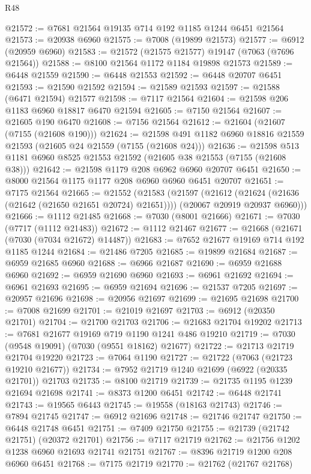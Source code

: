 \begin{lexlean}{R48}
\begin{coremodule}
@21572 := @7681 @21564 @19135 @714 @192 @1185 @1244 @6451 @21564
@21573 := @20938 @6960
@21575 := @7008 (@19899 @21573)
@21577 := @6912 (@20959 @6960)
@21583 := @21572 (@21575 @21577) @19147 (@7063 (@7696 @21564))
@21588 := @8100 @21564 @1172 @1184 @19898 @21573
@21589 := @6448 @21559
@21590 := @6448 @21553
@21592 := @6448 @20707 @6451
@21593 := @21590 @21592
@21594 := @21589 @21593
@21597 := @21588 (@6471 @21594) @21577
@21598 := @7117 @21564
@21604 := @21598 @206 @1183 @6960 @18817 @6470 @21594
@21605 := @7150 @21564
@21607 := @21605 @190 @6470
@21608 := @7156 @21564
@21612 := @21604 (@21607 (@7155 (@21608 @190)))
@21624 := @21598 @491 @1182 @6960 @18816 @21559 @21593 (@21605 @24 @21559 (@7155 (@21608 @24)))
@21636 := @21598 @513 @1181 @6960 @8525 @21553 @21592 (@21605 @38 @21553 (@7155 (@21608 @38)))
@21642 := @21598 @1179 @208 @6962 @6960 @20707 @6451
@21650 := @8000 @21564 @1175 @1177 @208 @6960 @6960 @6451 @20707
@21651 := @7175 @21564
@21665 := @21552
    (@21583
      (@21597
        (@21612 (@21624 (@21636 (@21642 (@21650 @21651 @20724) @21651))))
        (@20067 @20919 @20937 @6960)))
@21666 := @1112 @21485
@21668 := @7030 (@8001 @21666)
@21671 := @7030 (@7717 (@1112 @21483))
@21672 := @1112 @21467
@21677 := @21668 (@21671 (@7030 (@7034 @21672) @14487))
@21683 := @7652 @21677 @19169 @714 @192 @1185 @1244
@21684 := @21486 @7205
@21685 := @19899 @21684
@21687 := @6959 @21685 @6960
@21688 := @6966 @21687
@21690 := @6959 @21688 @6960
@21692 := @6959 @21690 @6960
@21693 := @6961 @21692
@21694 := @6961 @21693
@21695 := @6959 @21694
@21696 := @21537 @7205
@21697 := @20957 @21696
@21698 := @20956 @21697
@21699 := @21695 @21698
@21700 := @7008 @21699
@21701 := @21019 @21697
@21703 := @6912 (@20350 @21701)
@21704 := @21700 @21703
@21706 := @21683 @21704 @19202
@21713 := @7681 @21677 @19169 @719 @1190 @1241 @486 @19210
@21719 := @7030 (@9548 @19091) (@7030 (@9551 @18162) @21677)
@21722 := @21713 @21719 @21704 @19220
@21723 := @7064 @1190
@21727 := @21722 (@7063 (@21723 @19210 @21677))
@21734 := @7952 @21719 @1240 @21699 (@6922 (@20335 @21701)) @21703
@21735 := @8100 @21719
@21739 := @21735 @1195 @1239 @21694 @21698
@21741 := @8373 @1200 @6451
@21742 := @6448 @21741
@21743 := @19565 @6443
@21745 := @19558 (@18163 @21743)
@21746 := @7894 @21745
@21747 := @6912 @21696
@21748 := @21746 @21747
@21750 := @6448 @21748 @6451
@21751 := @7409 @21750
@21755 := @21739 (@21742 @21751) (@20372 @21701)
@21756 := @7117 @21719
@21762 := @21756 @1202 @1238 @6960 @21693 @21741 @21751
@21767 := @8396 @21719 @1200 @208 @6960 @6451
@21768 := @7175 @21719
@21770 := @21762 (@21767 @21768)

\end{coremodule}
\end{lexlean}
